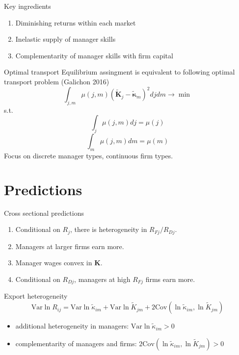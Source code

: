 \documentclass[
  ignorenonframetext,
  aspectratio=43,
]{beamer}
\providecommand{\tightlist}{%
  \setlength{\itemsep}{0pt}\setlength{\parskip}{0pt}}
\begin{document}
\begin{frame}{Key ingredients}
\protect\hypertarget{key-ingredients}{}
\begin{enumerate}
\tightlist
\item
  Diminishing returns within each market
\item
  Inelastic supply of manager skills
\item
  Complementarity of manager skills with firm capital
\end{enumerate}
\end{frame}

\begin{frame}{Optimal transport}
\protect\hypertarget{optimal-transport}{}
Equilibrium assingment is equivalent to following optimal transport
problem (Galichon 2016) \[
\int_{j,m}\mu(j,m) (\tilde {\mathbf K}_j - \tilde{\mathbf\kappa}_m)^2 djdm \to \min
\] s.t. \[
\int_j \mu(j,m) dj = \mu(j)
\] \[
\int_m \mu(j,m) dm = \mu(m)
\] Focus on discrete manager types, continuous firm types.
\end{frame}

\hypertarget{predictions}{%
\section{Predictions}\label{predictions}}

\begin{frame}{Cross sectional predictions}
\protect\hypertarget{cross-sectional-predictions}{}
\begin{enumerate}
\tightlist
\item
  Conditional on \(R_{j}\), there is heterogeneity in \(R_{Fj}/R_{Dj}\).
\item
  Managers at larger firms earn more.
\item
  Manager wages convex in \(\mathbf K\).
\item
  Conditional on \(R_{Dj}\), managers at high \(R_{Fj}\) firms earn
  more.
\end{enumerate}
\end{frame}

\begin{frame}{Export heterogeneity}
\protect\hypertarget{export-heterogeneity}{}
\[
\text{Var}\ln R_{ij} =
    \text{Var}\ln \tilde \kappa_{im} +
    \text{Var}\ln \tilde K_{jm} +
    2\text{Cov}(\ln \tilde \kappa_{im},
                \ln \tilde K_{jm})
\]

\begin{itemize}
\tightlist
\item
  additional heterogeneity in managers:
  \(\text{Var}\ln \tilde \kappa_{im}>0\)
\item
  complementarity of managers and firms:
  \(2\text{Cov}(\ln \tilde \kappa_{im},\ln \tilde K_{jm})>0\)
\end{itemize}
\end{frame}
\end{document}
